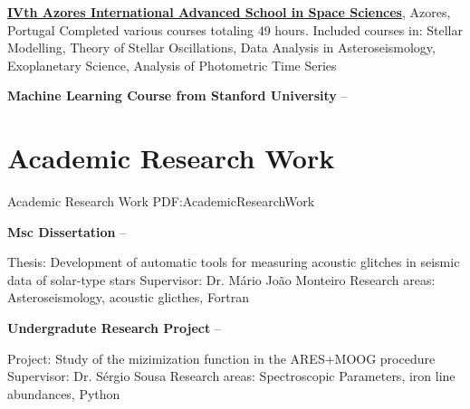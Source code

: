\documentclass[letterpaper,10pt,oneside]{article}
\begin{document}
\begin{body}
\href{http://www.iastro.pt/research/conferences/faial2016/}
{\textbf{IVth Azores International Advanced School in Space Sciences}},
Azores, Portugal
\hfill
{}
\GapNoBreak
\BulletItem
Completed various courses totaling 49 hours.
\BulletItem
Included courses in: Stellar Modelling, Theory of Stellar Oscillations, Data Analysis in Asteroseismology, Exoplanetary Science, Analysis of Photometric Time Series

\BigGap
{\textbf{Machine Learning Course from Stanford University}}
\hfill
{} --



\section
{Academic Research Work}
{Academic Research Work}
{PDF:AcademicResearchWork}

{\textbf{Msc Dissertation}}
\hfill
{} --
\begin{detail}
\SubBulletItem
Thesis: Development of automatic tools for measuring acoustic glitches in seismic data of solar-type stars
\SubBulletItem
Supervisor:
Dr. Mário João Monteiro
\SubBulletItem
Research areas: Asteroseismology, acoustic glicthes, Fortran
\end{detail}

\GapNoBreak
{\textbf{Undergradute Research Project}}
\hfill
{} --
\begin{detail}
\SubBulletItem
Project:
Study of the mizimization function in the ARES+MOOG procedure
\SubBulletItem
Supervisor:
Dr. Sérgio Sousa
\SubBulletItem
Research areas: Spectroscopic Parameters, iron line abundances, Python
\end{detail}






\end{body}
\end{document}
